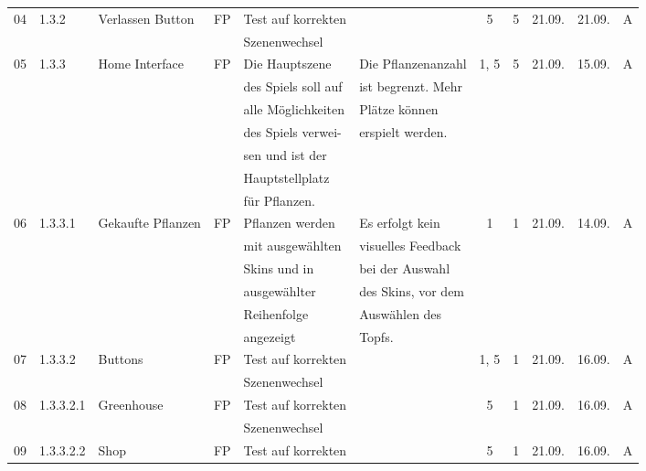 \begin{longtable}{|c|l|l|c|l|l|c|c|c|c|c|}
            04 & 1.3.2 & Verlassen Button & FP & Test auf korrekten &  & 5 & 5 & 21.09. & 21.09. & A \\
            &       &            &    & Szenenwechsel &   &   & & & &\\
            \hline
            05 & 1.3.3 & Home Interface & FP & Die Hauptszene & Die Pflanzenanzahl & 1, 5 & 5 & 21.09. & 15.09. & A \\
            &       &            &    & des Spiels soll auf &  ist begrenzt. Mehr  &   & & & &\\
            &       &            &    & alle Möglichkeiten & Plätze können  &   & & & &\\
            &       &            &    & des Spiels verwei- & erspielt werden.  &   & & & &\\
            &       &            &    & sen und ist der &   &   & & & &\\
            &       &            &    & Hauptstellplatz &   &   & & & &\\
            &       &            &    & für Pflanzen. &   &   & & & &\\
            \hline
            06 & 1.3.3.1 & Gekaufte Pflanzen & FP & Pflanzen werden & Es erfolgt kein & 1 & 1 & 21.09. & 14.09. & A \\
            &       &            &    & mit ausgewählten &  visuelles Feedback  &   & & & &\\
            &       &            &    & Skins und in & bei der Auswahl  &   & & & &\\
            &       &            &    & ausgewählter & des Skins, vor dem  &   & & & &\\
            &       &            &    & Reihenfolge &  Auswählen des &   & & & &\\
            &       &            &    & angezeigt & Topfs.  &   & & & &\\
            \hline
            07 & 1.3.3.2 & Buttons & FP & Test auf korrekten &  & 1, 5 & 1 & 21.09. & 16.09. & A \\
            &       &            &    & Szenenwechsel &   &   & & & &\\
            \hline
            08 & 1.3.3.2.1 & Greenhouse & FP & Test auf korrekten &  & 5 & 1 & 21.09. & 16.09. & A \\
            &       &            &    & Szenenwechsel &   &   & & & &\\
            \hline
            09 & 1.3.3.2.2 & Shop & FP & Test auf korrekten &  & 5 & 1 & 21.09. & 16.09. & A \\

\end{longtable}
